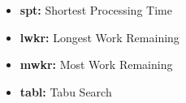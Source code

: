 \begin{itemize}
    \item \textbf{spt:} Shortest Processing Time
    \item \textbf{lwkr:} Longest Work Remaining
    \item \textbf{mwkr:} Most Work Remaining
    \item \textbf{tabl:} Tabu Search
\end{itemize}

